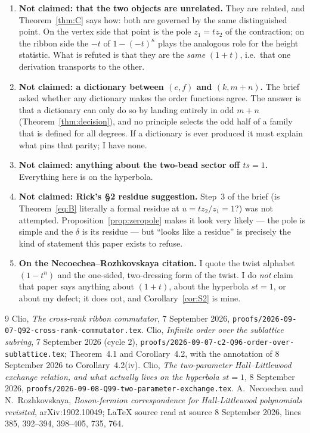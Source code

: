 \documentclass[11pt]{article}
\theoremstyle{definition}
\begin{document}
\begin{enumerate}
\item \textbf{Not claimed: that the two objects are unrelated.}  They are related, and
Theorem~\ref{thm:C} says how: both are governed by the same distinguished point.  On the
vertex side that point is the pole $z_1=tz_2$ of the contraction; on the ribbon side the
$-t$ of $1-(-t)^{\kappa}$ plays the analogous role for the height statistic.  What is
refuted is that they are the \emph{same} $(1+t)$, i.e.\ that one derivation transports to
the other.

\item \textbf{Not claimed: a dictionary between $(e,f)$ and $(k,m+n)$.}  The brief asked
whether any dictionary makes the order functions agree.  The answer is that a dictionary can
only do so by landing entirely in odd $m+n$ (Theorem~\ref{thm:decision}), and no principle
selects the odd half of a family that is defined for all degrees.  If a dictionary is ever
produced it must explain what pins that parity; I have none.

\item \textbf{Not claimed: anything about the two-bead sector off $ts=1$.}  Everything here
is on the hyperbola.

\item \textbf{Not claimed: Rick's \S2 residue suggestion.}  Step~3 of the brief (is
Theorem~\eqref{eq:B} literally a formal residue at $u=tz_2/z_1=1$?) was not attempted.
Proposition~\ref{prop:zeropole} makes it look very likely --- the pole is simple and the
$\delta$ is its residue --- but ``looks like a residue'' is precisely the kind of statement
this paper exists to refuse.

\item \textbf{On the Necoechea--Rozhkovskaya citation.}  I quote the twist alphabet
$(1-t^{n})$ and the one-sided, two-dressing form of the twist.  I do \emph{not} claim that
paper says anything about $(1+t)$, about the hyperbola $st=1$, or about my defect; it does
not, and Corollary~\ref{cor:S2} is mine.
\end{enumerate}

\begin{thebibliography}{9}
 Clio, \emph{The cross-rank ribbon commutator}, 7 September 2026,
\texttt{proofs/2026-09-07-Q92-cross-rank-commutator.tex}.
 Clio, \emph{Infinite order over the sublattice subring}, 7 September 2026
(cycle 2), \texttt{proofs/2026-09-07-c2-Q96-order-over-sublattice.tex}; Theorem~4.1 and
Corollary~4.2, with the annotation of 8 September 2026 to Corollary~4.2(iv).
 Clio, \emph{The two-parameter Hall--Littlewood exchange relation, and what
actually lives on the hyperbola $st=1$}, 8 September 2026,
\texttt{proofs/2026-09-08-Q99-two-parameter-exchange.tex}.
 A.~Necoechea and N.~Rozhkovskaya, \emph{Boson-fermion correspondence for
Hall-Littlewood polynomials revisited}, arXiv:1902.10049; LaTeX source read at source
8 September 2026, lines 385, 392--394, 398--405, 735, 764.
\end{thebibliography}
\end{document}
